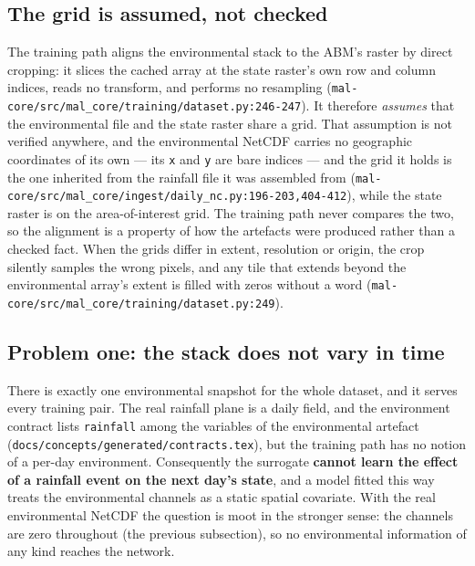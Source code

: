 \documentclass[11pt,a4paper]{article}
\newcommand{\codex}[1]{\texttt{#1}}
\begin{document}
\subsection{The grid is assumed, not checked}

The training path aligns the environmental stack to the ABM's raster by
direct cropping: it slices the cached array at the state raster's own row
and column indices, reads no transform, and performs no resampling
(\codex{mal-core/\allowbreak{}src/\allowbreak{}mal\_\allowbreak{}core/\allowbreak{}training/\allowbreak{}dataset.py:246-247}). It therefore
\emph{assumes} that the environmental file and the state raster share a
grid. That assumption is not verified anywhere, and the environmental
NetCDF carries no geographic coordinates of its own --- its \codex{x} and
\codex{y} are bare indices --- and the grid it holds is the one inherited from
the rainfall file it was assembled from
(\codex{mal-core/\allowbreak{}src/\allowbreak{}mal\_\allowbreak{}core/\allowbreak{}ingest/\allowbreak{}daily\_\allowbreak{}nc.py:196-203,404-412}), while the
state raster is on the area-of-interest grid. The training path never
compares the two, so the alignment is a property of how the artefacts were
produced rather than a checked fact. When the grids differ in
extent, resolution or origin, the crop silently samples the wrong pixels,
and any tile that extends beyond the environmental array's extent is filled
with zeros without a word
(\codex{mal-core/\allowbreak{}src/\allowbreak{}mal\_\allowbreak{}core/\allowbreak{}training/\allowbreak{}dataset.py:249}).

\subsection{Problem one: the stack does not vary in time}

There is exactly one environmental snapshot for the whole dataset, and it
serves every training pair. The real rainfall plane is a daily field, and the
environment contract lists \codex{rainfall} among the variables of the
environmental artefact (\codex{docs/\allowbreak{}concepts/\allowbreak{}generated/\allowbreak{}contracts.tex}), but the
training path has no notion of a per-day environment. Consequently the
surrogate \textbf{cannot learn the effect of a rainfall event on the next
day's state}, and a model fitted this way treats the environmental channels
as a static spatial covariate. With the real environmental NetCDF the
question is moot in the stronger sense: the channels are zero throughout
(the previous subsection), so no environmental information of any kind
reaches the network.
\end{document}
